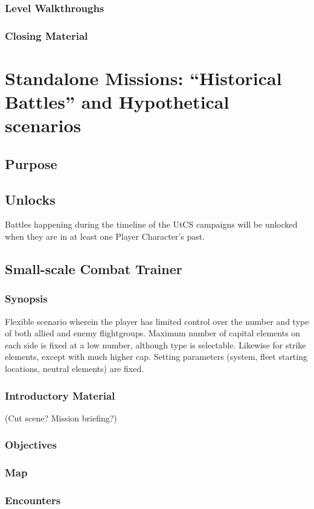 \subsubsection{Level Walkthroughs}
\subsubsection{Closing Material}

\section{Standalone Missions: ``Historical Battles'' and Hypothetical scenarios}
\subsection{Purpose}
\subsection{Unlocks}
Battles happening during the timeline of the UtCS campaigns will be unlocked when they are in at least one Player Character's past.

\subsection{Small-scale Combat Trainer}
\subsubsection{Synopsis}
Flexible scenario wherein the player has limited control over the number and type of both allied and enemy flightgroups. Maximum number of capital elements on each side is fixed at a low number, although type is selectable. Likewise for strike elements, except with much higher cap. Setting parameters (system, fleet starting locations, neutral elements) are fixed.
\subsubsection{Introductory Material}
 (Cut scene?  Mission briefing?)
\subsubsection{Objectives}
\subsubsection{Map}
\subsubsection{Encounters}

